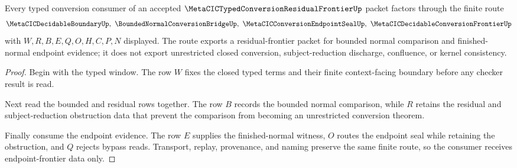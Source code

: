 \begin{theorem}
\label{thm:metacic-typed-conversion-endpoint-frontier}
Every typed conversion consumer of an accepted $\MetaCICTypedConversionResidualFrontierUp$ packet factors through the finite route
$$
\MetaCICDecidableBoundaryUp,\ \BoundedNormalConversionBridgeUp,\ \MetaCICConversionEndpointSealUp,\ \MetaCICDecidableConversionFrontierUp
$$
with $W,R,B,E,Q,O,H,C,P,N$ displayed. The route exports a residual-frontier packet for bounded normal comparison and finished-normal endpoint evidence; it does not export unrestricted closed conversion, subject-reduction discharge, confluence, or kernel consistency.
\end{theorem}
\begin{proof}
Begin with the typed window. The row $W$ fixes the closed typed terms and their finite context-facing boundary before any checker result is read.

Next read the bounded and residual rows together. The row $B$ records the bounded normal comparison, while $R$ retains the residual and subject-reduction obstruction data that prevent the comparison from becoming an unrestricted conversion theorem.

Finally consume the endpoint evidence. The row $E$ supplies the finished-normal witness, $O$ routes the endpoint seal while retaining the obstruction, and $Q$ rejects bypass reads. Transport, replay, provenance, and naming preserve the same finite route, so the consumer receives endpoint-frontier data only.
\end{proof}





